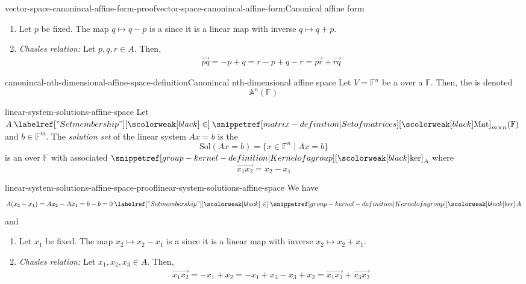\documentclass[preview]{standalone}
\begin{document}
\begin{snippetproof}{vector-space-canonincal-affine-form-proof}{vector-space-canonincal-affine-form}{Canonical affine form}
    \begin{enumerate}
        \item Let \(p\) be fixed. The map \(q \mapsto q - p\) is a \bijective[bijection] since it is a linear map with inverse \(q \mapsto q + p\).
        \item \emph{Chasles relation:} Let \(p, q, r \in A\). Then,
        \begin{align*}
            \vec{pq} = -p + q = r-p+q-r = \vec{pr} + \vec{rq}
        \end{align*}
    \end{enumerate}
\end{snippetproof}

\begin{snippetdefinition}{canonincal-nth-dimensional-affine-space-definition}{Canonincal nth-dimensional affine space}
    Let \(V=\mathbb{F}^n\) be a \vectorspace over a \field \(\mathbb{F}\).
    Then, the  \affinespace is denoted
    \[
        \mathbb{A}^n(\mathbb{F})
    \]
\end{snippetdefinition}

\begin{snippetproposition}{linear-system-solutions-affine-space}{}
    Let \(A \in \matrices_{m \times n}(\mathbb{F})\)
    and \(b \in \mathbb{F}^m\).
    The \emph{solution set} of the linear system \(Ax = b\) is the \set
    \[
        \text{Sol}(Ax = b) = \{x \in \mathbb{F}^n \mid Ax = b\}
    \]
    is an \affinespace over \(\mathbb{F}\) with associated \vectorspace
    \(\grpker_A\) where
    \[
        \vec{x_1x_2} = x_2 - x_1
    \]
\end{snippetproposition}

\begin{snippetproof}{linear-system-solutions-affine-space-proof}{linear-system-solutions-affine-space}{}
    We have
    \[
        A(x_2 - x_1) = Ax_2 - Ax_1 = b - b = 0 \in \grpker A
    \]
    and
    \begin{enumerate}
        \item Let \(x_1\) be fixed. The map \(x_2 \mapsto x_2 - x_1\) is a \bijective[bijection] since it is a linear map with inverse \(x_2 \mapsto x_2 + x_1\).
        \item \emph{Chasles relation:} Let \(x_1, x_2, x_3 \in A\). Then,
        \begin{align*}
            \vec{x_1x_2} = -x_1 + x_2 = -x_1 + x_3 - x_3 + x_2 = \vec{x_1x_3} + \vec{x_3x_2}
        \end{align*}
    \end{enumerate}
\end{snippetproof}
\end{document}
